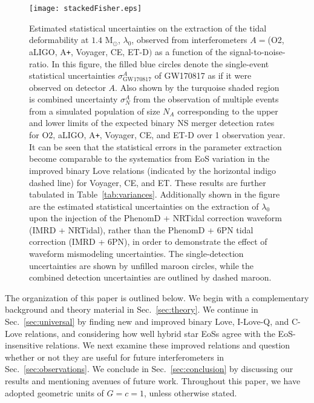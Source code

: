 \documentclass[prd,twocolumn,nofootinbib,superscriptaddress,amsmath,amssymb]{revtex4-1}
\begin{document}
\begin{figure}
\begin{center} 
\texttt{[image: stackedFisher.eps]}
\end{center}
\caption{
Estimated statistical uncertainties on the extraction of the tidal deformability at $1.4 \text{ M}_{\odot}$, $\lambda_0$, observed from interferometers $A=$(O2, aLIGO, A\texttt{+}, Voyager, CE, ET-D$)$ as a function of the signal-to-noise-ratio.
In this figure, the filled blue circles denote the single-event statistical uncertainties $\sigma^A_{\text{GW170817}}$ of GW170817 as if it were observed on detector $A$.
Also shown by the turquoise shaded region is combined uncertainty $\sigma^A_N$  from the observation of multiple events from a simulated population of size $N_A$ corresponding to the upper and lower limits of the expected binary NS merger detection rates for O2, aLIGO, A\texttt{+}, Voyager, CE, and ET-D over 1 observation year.
It can be seen that the statistical errors in the parameter extraction become comparable to the systematics from EoS variation in the improved binary Love relations (indicated by the horizontal indigo dashed line) for Voyager, CE, and ET.
These results are further tabulated in Table~\ref{tab:variances}.
Additionally shown in the figure are the estimated statistical uncertainties on the extraction of $\lambda_0$ upon the injection of the PhenomD + NRTidal correction waveform (IMRD + NRTidal), rather than the PhenomD + 6PN tidal correction (IMRD + 6PN), in order to demonstrate the effect of waveform mismodeling uncertainties.
The single-detection uncertainties are shown by unfilled maroon circles, while the combined detection uncertainties are outlined by dashed maroon.
}
\label{fig:stackedFisher}
\end{figure} 

The organization of this paper is outlined below.
We begin with a complementary background and theory material in Sec.~\ref{sec:theory}.
We continue in Sec.~\ref{sec:universal} by finding new and improved binary Love, I-Love-Q, and C-Love relations, and considering how well hybrid star EoSs agree with the EoS-insensitive relations.
We next examine these improved relations and question whether or not they are useful for future interferometers in Sec.~\ref{sec:observations}.
We conclude in Sec.~\ref{sec:conclusion} by discussing our results and mentioning avenues of future work.
Throughout this paper, we have adopted geometric units of $G=c=1$, unless otherwise stated.
\end{document}
